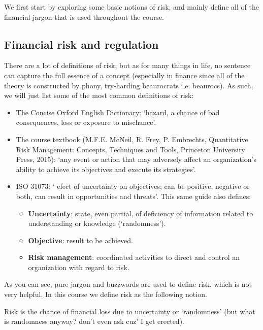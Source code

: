 We first start by exploring some basic notions of risk, and mainly define all of the financial jargon that is used throughout the course.

\subsection{Financial risk and regulation}
There are a lot of definitions of risk, but as for many things in life, no sentence can capture the full essence of a concept (especially in finance since all of the theory is constructed by phony, try-harding beaurocrats i.e. beaurocs).
As such, we will just list some of the most common definitions of risk:

\vspace{0.2cm}

\begin{itemize}
    \item The Concise Oxford English Dictionary: `hazard, a chance of bad consequences, loss or exposure to mischance'.
    \item The course textbook (M.F.E. McNeil, R. Frey, P. Embrechts, Quantitative Risk Management: Concepts, Techniques and Tools, Princeton University Press, 2015): `any event or action that may adversely affect an organization's ability to achieve 
    its objectives and execute its strategies'.
    \item ISO 31073: ` efect of uncertainty on objectives; can be positive, negative or both, can result in opportunities and threats'. This same guide also defines: 
    \begin{itemize}
        \item \textbf{Uncertainty}: state, even partial, of deficiency of information related to understanding or knowledge (`randomness').
        \item \textbf{Objective}: result to be achieved.
        \item \textbf{Risk management}: coordinated activities to direct and control an organization with regard to risk.
    \end{itemize}
\end{itemize}

\vspace{0.2cm}

As you can see, pure jargon and buzzwords are used to define risk, which is not very helpful. In this course we define risk as the following notion.

\begin{definition}
    Risk is the chance of financial loss due to uncertainty or `randomness' (but what is randomness anyway? don't even ask cuz' I get erected).
\end{definition}

